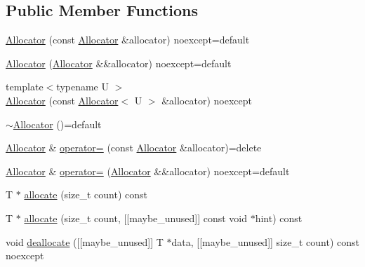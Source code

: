 \subsection*{Public Member Functions}
\begin{DoxyCompactItemize}
\item 
\mbox{\hyperlink{classmage_1_1_memory_arena_1_1_allocator_a2e2645fcc2598ff377c88859ba153606}{Allocator}} (const \mbox{\hyperlink{classmage_1_1_memory_arena_1_1_allocator}{Allocator}} \&allocator) noexcept=default
\item 
\mbox{\hyperlink{classmage_1_1_memory_arena_1_1_allocator_a153cec9d65f697b3e8631c866b2abe96}{Allocator}} (\mbox{\hyperlink{classmage_1_1_memory_arena_1_1_allocator}{Allocator}} \&\&allocator) noexcept=default
\item 
{\footnotesize template$<$typename U $>$ }\\\mbox{\hyperlink{classmage_1_1_memory_arena_1_1_allocator_a412318dd063697fc4a2238c131b5e0e9}{Allocator}} (const \mbox{\hyperlink{classmage_1_1_memory_arena_1_1_allocator}{Allocator}}$<$ U $>$ \&allocator) noexcept
\item 
\mbox{\hyperlink{classmage_1_1_memory_arena_1_1_allocator_afbac57b961cea93932dff48c0a104c50}{$\sim$\+Allocator}} ()=default
\item 
\mbox{\hyperlink{classmage_1_1_memory_arena_1_1_allocator}{Allocator}} \& \mbox{\hyperlink{classmage_1_1_memory_arena_1_1_allocator_aca3a631f0323c15f27dfc7ce42763be0}{operator=}} (const \mbox{\hyperlink{classmage_1_1_memory_arena_1_1_allocator}{Allocator}} \&allocator)=delete
\item 
\mbox{\hyperlink{classmage_1_1_memory_arena_1_1_allocator}{Allocator}} \& \mbox{\hyperlink{classmage_1_1_memory_arena_1_1_allocator_a4d9c913c8eff35781d507875f6f83934}{operator=}} (\mbox{\hyperlink{classmage_1_1_memory_arena_1_1_allocator}{Allocator}} \&\&allocator) noexcept=default
\item 
T $\ast$ \mbox{\hyperlink{classmage_1_1_memory_arena_1_1_allocator_a6ccab19e9d75a98aafe5bc91f6aefd5f}{allocate}} (size\+\_\+t count) const
\item 
T $\ast$ \mbox{\hyperlink{classmage_1_1_memory_arena_1_1_allocator_a09fe7399fffff4574529ccbbe3fd8c3e}{allocate}} (size\+\_\+t count, \mbox{[}\mbox{[}maybe\+\_\+unused\mbox{]}\mbox{]} const void $\ast$hint) const
\item 
void \mbox{\hyperlink{classmage_1_1_memory_arena_1_1_allocator_a06bb167c058e04e1acd38151c7381f4e}{deallocate}} (\mbox{[}\mbox{[}maybe\+\_\+unused\mbox{]}\mbox{]} T $\ast$data, \mbox{[}\mbox{[}maybe\+\_\+unused\mbox{]}\mbox{]} size\+\_\+t count) const noexcept

\end{DoxyCompactItemize}

